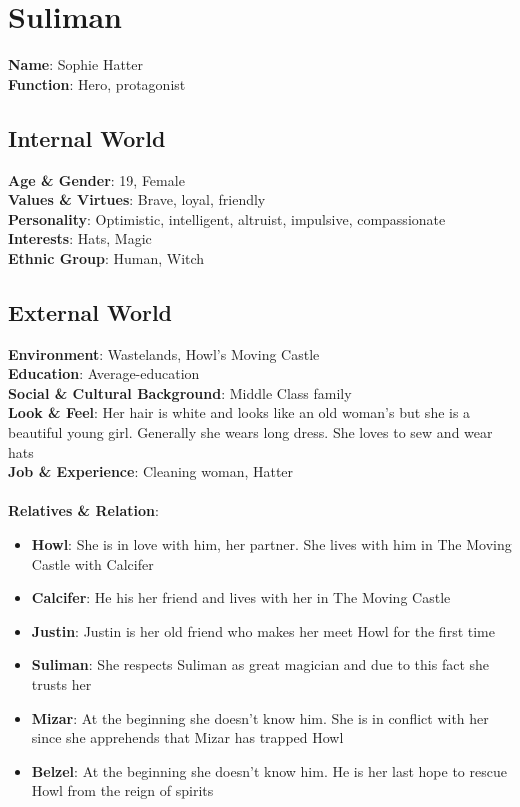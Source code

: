 \section{Suliman}

\textbf{Name}: Sophie Hatter \\
\textbf{Function}: Hero, protagonist

\subsection{Internal World}

\textbf{Age \& Gender}: 19, Female \\
\textbf{Values \& Virtues}: Brave, loyal, friendly \\
\textbf{Personality}: Optimistic, intelligent, altruist, impulsive, compassionate \\
\textbf{Interests}: Hats, Magic \\
\textbf{Ethnic Group}: Human, Witch

\subsection{External World}
\textbf{Environment}: Wastelands, Howl’s Moving Castle \\
\textbf{Education}: Average-education \\
\textbf{Social \& Cultural Background}: Middle Class family \\
\textbf{Look \& Feel}: Her hair is white and looks like an old woman’s but she is a beautiful young girl. Generally she wears long dress. She loves to sew and wear hats \\
\textbf{Job \& Experience}: Cleaning woman, Hatter \\
\\
\textbf{Relatives \& Relation}:
\begin{itemize}
\item \textbf{Howl}: She is in love with him, her partner. She lives with him in The Moving Castle with Calcifer
\item \textbf{Calcifer}: He his her friend and lives with her in The Moving Castle
\item \textbf{Justin}: Justin is her old friend who makes her meet Howl for the first time
\item \textbf{Suliman}: She respects Suliman as great magician and due to this fact she trusts her
\item \textbf{Mizar}: At the beginning she doesn’t know him. She is in conflict with her since she 
apprehends that Mizar has trapped Howl
\item \textbf{Belzel}: At the beginning she doesn’t know him. He is her last hope to rescue Howl from the reign of spirits
\end{itemize}

